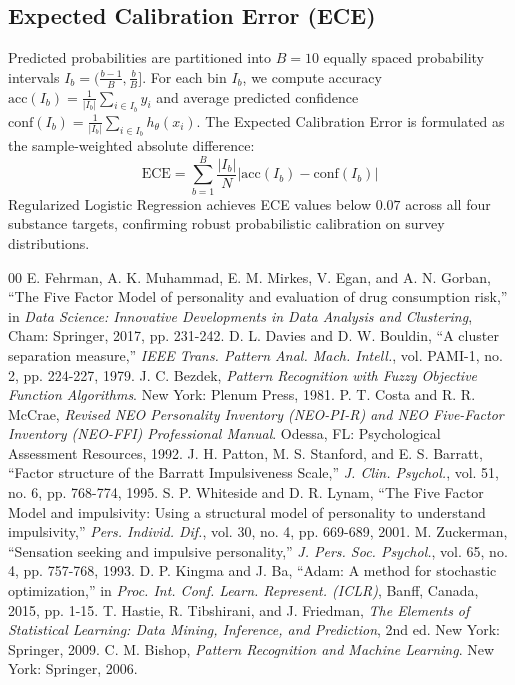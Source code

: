 \documentclass[conference]{IEEEtran}
\begin{document}
\subsection{Expected Calibration Error (ECE)}
Predicted probabilities are partitioned into $B = 10$ equally spaced probability intervals $I_b = (\frac{b-1}{B}, \frac{b}{B}]$. For each bin $I_b$, we compute accuracy $\text{acc}(I_b) = \frac{1}{|I_b|} \sum_{i \in I_b} y_i$ and average predicted confidence $\text{conf}(I_b) = \frac{1}{|I_b|} \sum_{i \in I_b} h_\theta(x_i)$. The Expected Calibration Error is formulated as the sample-weighted absolute difference:
\begin{equation}
\text{ECE} = \sum_{b=1}^B \frac{|I_b|}{N} \left| \text{acc}(I_b) - \text{conf}(I_b) \right|
\end{equation}
Regularized Logistic Regression achieves ECE values below $0.07$ across all four substance targets, confirming robust probabilistic calibration on survey distributions.

\begin{thebibliography}{00}
\fontsize{8.0pt}{9.2pt}\selectfont
\setlength{\itemsep}{0pt}
\setlength{\parskip}{0pt}
 E. Fehrman, A. K. Muhammad, E. M. Mirkes, V. Egan, and A. N. Gorban, ``The Five Factor Model of personality and evaluation of drug consumption risk,'' in \textit{Data Science: Innovative Developments in Data Analysis and Clustering}, Cham: Springer, 2017, pp. 231-242.
 D. L. Davies and D. W. Bouldin, ``A cluster separation measure,'' \textit{IEEE Trans. Pattern Anal. Mach. Intell.}, vol. PAMI-1, no. 2, pp. 224-227, 1979.
 J. C. Bezdek, \textit{Pattern Recognition with Fuzzy Objective Function Algorithms}. New York: Plenum Press, 1981.
 P. T. Costa and R. R. McCrae, \textit{Revised NEO Personality Inventory (NEO-PI-R) and NEO Five-Factor Inventory (NEO-FFI) Professional Manual}. Odessa, FL: Psychological Assessment Resources, 1992.
 J. H. Patton, M. S. Stanford, and E. S. Barratt, ``Factor structure of the Barratt Impulsiveness Scale,'' \textit{J. Clin. Psychol.}, vol. 51, no. 6, pp. 768-774, 1995.
 S. P. Whiteside and D. R. Lynam, ``The Five Factor Model and impulsivity: Using a structural model of personality to understand impulsivity,'' \textit{Pers. Individ. Dif.}, vol. 30, no. 4, pp. 669-689, 2001.
 M. Zuckerman, ``Sensation seeking and impulsive personality,'' \textit{J. Pers. Soc. Psychol.}, vol. 65, no. 4, pp. 757-768, 1993.
 D. P. Kingma and J. Ba, ``Adam: A method for stochastic optimization,'' in \textit{Proc. Int. Conf. Learn. Represent. (ICLR)}, Banff, Canada, 2015, pp. 1-15.
 T. Hastie, R. Tibshirani, and J. Friedman, \textit{The Elements of Statistical Learning: Data Mining, Inference, and Prediction}, 2nd ed. New York: Springer, 2009.
 C. M. Bishop, \textit{Pattern Recognition and Machine Learning}. New York: Springer, 2006.
\end{thebibliography}
\end{document}
